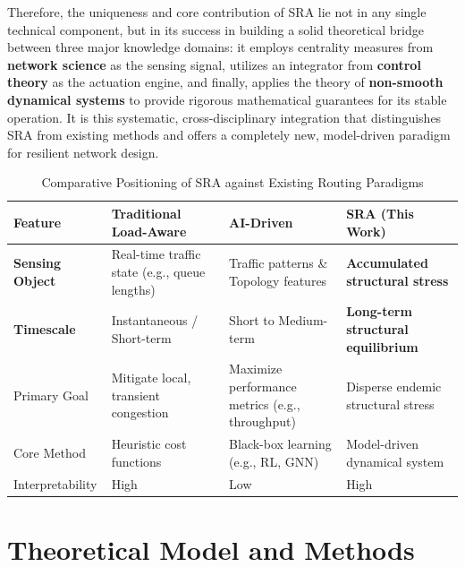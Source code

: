 \documentclass[journal]{IEEEtran}
\begin{document}
Therefore, the uniqueness and core contribution of SRA lie not in any single technical component, but in its success in building a solid theoretical bridge between three major knowledge domains: it employs centrality measures from \textbf{network science} as the sensing signal, utilizes an integrator from \textbf{control theory} as the actuation engine, and finally, applies the theory of \textbf{non-smooth dynamical systems} to provide rigorous mathematical guarantees for its stable operation. It is this systematic, cross-disciplinary integration that distinguishes SRA from existing methods and offers a completely new, model-driven paradigm for resilient network design.


\begin{table}[t!]
\centering
\caption{Comparative Positioning of SRA against Existing Routing Paradigms}
\label{tab:related_work_comparison}
\renewcommand{\arraystretch}{1.2}
\small
\begin{tabularx}{\columnwidth}{|l|X|X|X|}
\hline
\textbf{Feature} & \textbf{Traditional Load-Aware} & \textbf{AI-Driven} & \textbf{SRA (This Work)} \\
\hline \hline
\textbf{Sensing Object} & Real-time traffic state (e.g., queue lengths) & Traffic patterns \& Topology features & \textbf{Accumulated structural stress} \\
\hline
\textbf{Timescale} & Instantaneous / Short-term & Short to Medium-term & \textbf{Long-term structural equilibrium} \\
\hline
Primary Goal & Mitigate local, transient congestion & Maximize performance metrics (e.g., throughput) & Disperse endemic structural stress \\
\hline
Core Method & Heuristic cost functions & Black-box learning (e.g., RL, GNN) & Model-driven dynamical system \\
\hline
Interpretability & High & Low & High \\
\hline
\end{tabularx}
\end{table}

\section{Theoretical Model and Methods}
\label{sec:model}
\end{document}
